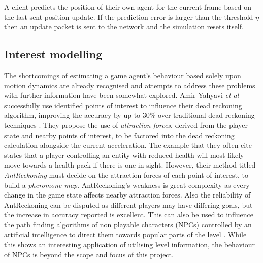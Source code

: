 \documentclass[journal]{IEEEtran}
\begin{document}
\begin{algorithm}
\DontPrintSemicolon %
\caption{A client predicts the position of their own agent for the current frame based on the last sent position update. If the prediction error is larger than the threshold ${\eta}$ then an update packet is sent to the network and the simulation resets itself.}
\label{algo:pseudo}
\end{algorithm}

\subsection{Interest modelling}

The shortcomings of estimating a game agent's behaviour based solely upon motion dynamics are already recognised and attempts to address these problems with further information have been somewhat explored. Amir Yahyavi \textit{et al} successfully use identified points of interest to influence their dead reckoning algorithm, improving the accuracy by up to 30\% over traditional dead reckoning techniques \cite{yahyavi2011antreckoning}. They propose the use of \textit{attraction forces}, derived from the player state and nearby points of interest, to be factored into the dead reckoning calculation alongside the current acceleration. The example that they often cite states that a player controlling an entity with reduced health will most likely move towards a health pack if there is one in sight. However, their method titled \textit{AntReckoning} must decide on the attraction forces of each point of interest, to build a \textit{pheromone map}. AntReckoning's weakness is great complexity as every change in the game state affects nearby attraction forces. Also the reliability of AntReckoning can be disputed as different players may have differing goals, but the increase in accuracy reported is excellent. This can also be used to influence the path finding algorithms of non playable characters (NPCs) controlled by an artificial intelligence to direct them towards popular parts of the level \cite{yahyavi2013interest} \cite{yahyavi2013towards}. While this shows an interesting application of utilising level information, the behaviour of NPCs is beyond the scope and focus of this project.
\end{document}
